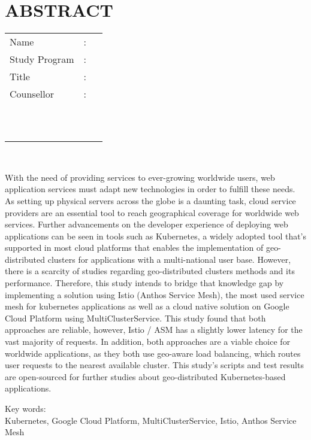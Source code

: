 %
%
%

\chapter*{ABSTRACT}
\singlespacing

\vspace*{0.2cm}

\def\blank{}

\noindent \begin{tabular}{l l p{11.0cm}}
	Name&: & \penulis \\
	Study Program&: & \studyProgram \\
	Title&: & \judulInggris \\
	Counsellor&: & \pembimbingSatu \\
	\ifx\blank\pembimbingDua
	\else
		\ &\ & \pembimbingDua \\
	\fi
	\ifx\blank\pembimbingTiga
	\else
		\ &\ & \pembimbingTiga \\
	\fi
\end{tabular} \\

\vspace*{0.5cm}

\noindent With the need of providing services to ever-growing worldwide users, web application services must adapt new technologies in order to fulfill these needs. As setting up physical servers across the globe is a daunting task, cloud service providers are an essential tool to reach geographical coverage for worldwide web services. Further advancements on the developer experience of deploying web applications can be seen in tools such as Kubernetes, a widely adopted tool that's supported in most cloud platforms that enables the implementation of geo-distributed clusters for applications with a multi-national user base. However, there is a scarcity of studies regarding geo-distributed clusters methods and its performance. Therefore, this study intends to bridge that knowledge gap by implementing a solution using Istio (Anthos Service Mesh), the most used service mesh for kubernetes applications as well as a cloud native solution on Google Cloud Platform using MultiClusterService. This study found that both approaches are reliable, however, Istio / ASM has a slightly lower latency for the vast majority of requests. In addition, both approaches are a viable choice for worldwide applications, as they both use geo-aware load balancing, which routes user requests to the nearest available cluster. This study's scripts and test results are open-sourced for further studies about geo-distributed Kubernetes-based applications.\\

\vspace*{0.2cm}

\noindent Key words: \\ Kubernetes, Google Cloud Platform, MultiClusterService, Istio, Anthos Service Mesh \\

\newpage
